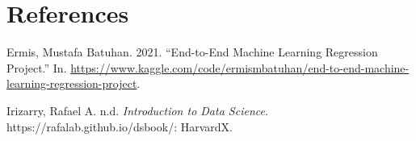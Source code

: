 \documentclass[
]{article}
\newlength{\cslhangindent}
\newlength{\cslentryspacingunit} %
\newenvironment{CSLReferences}[2] %
 {%
  \setlength{\parindent}{0pt}
  \ifodd #1
  \let\oldpar\par
  \def\par{\hangindent=\cslhangindent\oldpar}
  \fi
  \setlength{\parskip}{#2\cslentryspacingunit}
 }%
 {}
\begin{document}
\hypertarget{references}{%
\section*{References}\label{references}}

\hypertarget{refs}{}
\begin{CSLReferences}{1}{0}
\leavevmode{}%
Ermis, Mustafa Batuhan. 2021. {``End-to-End Machine Learning Regression Project.''} In. \url{https://www.kaggle.com/code/ermismbatuhan/end-to-end-machine-learning-regression-project}.

\leavevmode{}%
Irizarry, Rafael A. n.d. \emph{Introduction to Data Science}. https://rafalab.github.io/dsbook/: HarvardX.

\end{CSLReferences}
\end{document}

